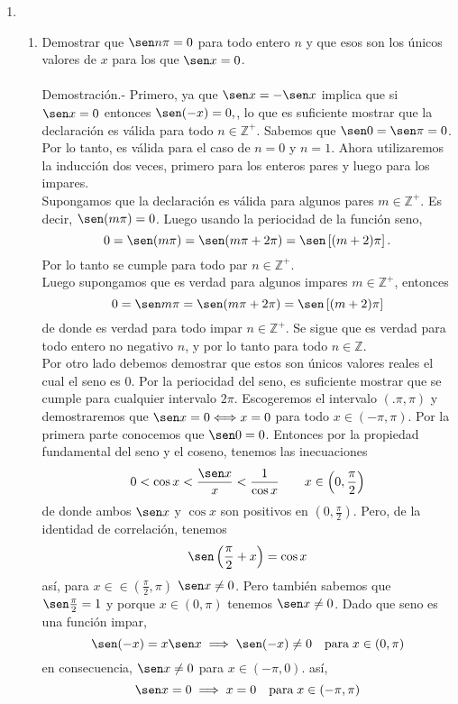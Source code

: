 \begin{enumerate}

\item 
\begin{enumerate}{\bfseries (a)}

    \item Demostrar que $\sen n\pi =0$ para todo entero $n$ y que esos son los únicos valores de $x$ para los que $\sen x = 0$.\\\\
	Demostración.-\; Primero, ya que $\sen x = -\sen x$ implica que si $\sen x = 0$ entonces $\sen(-x)=0,$, lo que es suficiente mostrar que la declaración es válida para todo $n \in \mathbb{Z}^+$. Sabemos que $\sen 0 = \sen \pi = 0$. Por lo tanto, es válida para el caso de $n=0$ y $n=1$. Ahora utilizaremos la inducción dos veces, primero para los enteros pares y luego para los impares.\\
	Supongamos que la declaración es válida para algunos pares $m\in \mathbb{Z}^+$. Es decir, $\sen(m\pi)=0$. Luego usando la periocidad de la función seno, $$0=\sen(m\pi)=\sen(m\pi + 2\pi)=\sen\left[(m+2)\pi\right].$$  
	Por lo tanto se cumple para todo par $n\in \mathbb{Z}^+$.\\
	Luego supongamos que es verdad para algunos impares $m\in \mathbb{Z}^+$, entonces $$0=\sen m\pi = \sen(m\pi+2\pi)=\sen\left[(m+2)\pi\right]$$
	de donde es verdad para todo impar $n\in \mathbb{Z}^+$. Se sigue que es verdad para todo entero no negativo $n$, y por lo tanto para todo $n\in \mathbb{Z}$.\\
	Por otro lado debemos demostrar que estos son únicos valores reales el cual el seno es $0$. Por la periocidad del seno, es suficiente mostrar que se cumple para cualquier intervalo $2\pi$. Escogeremos el intervalo $(.\pi,\pi)$ y demostraremos que $\sen x=0 \Longleftrightarrow x=0$ para todo $x\in (-\pi,\pi)$. Por la primera parte conocemos que $\sen 0 = 0$. Entonces por la propiedad fundamental del seno y el coseno, tenemos las inecuaciones $$0<\cos x <\dfrac{\sen x}{x}<\dfrac{1}{\cos x} \qquad x\in \left(0,\dfrac{\pi}{2}\right)$$
	de donde ambos $\sen x$ y $\cos x$ son positivos en $\left(0,\frac{\pi}{2}\right)$. Pero, de la identidad de correlación, tenemos 
	$$\sen\left(\dfrac{\pi}{2}+x\right)=\cos x$$
	así, para $x\in \in (\frac{\pi}{2},\pi)$ $\sen x \neq 0$. Pero también sabemos que $\sen\frac{\pi}{2}=1$ y porque $x\in (0,\pi)$ tenemos $\sen x\neq 0$. Dado que seno es una función impar, $$\sen(-x)=x\sen x \; \Longrightarrow \; \sen(-x)\neq 0 \quad \mbox{para}\; x \in (0,\pi)$$
	en consecuencia, $\sen x\neq 0$ para $x\in (-\pi,0).$ así, $$\sen x=0 \; \Longrightarrow \; x=0 \quad \mbox{para}\; x\in (-\pi,\pi)$$\\


\end{enumerate}
\end{enumerate}
